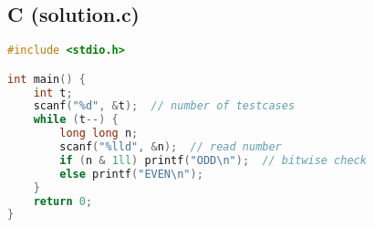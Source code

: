 \documentclass[11pt,a4paper]{article}
\begin{document}
\subsection*{C (solution.c)}
\begin{lstlisting}[language=C]
#include <stdio.h>

int main() {
    int t;
    scanf("%d", &t);  // number of testcases
    while (t--) {
        long long n;
        scanf("%lld", &n);  // read number
        if (n & 1ll) printf("ODD\n");  // bitwise check
        else printf("EVEN\n");
    }
    return 0;
}
\end{lstlisting}
\end{document}
